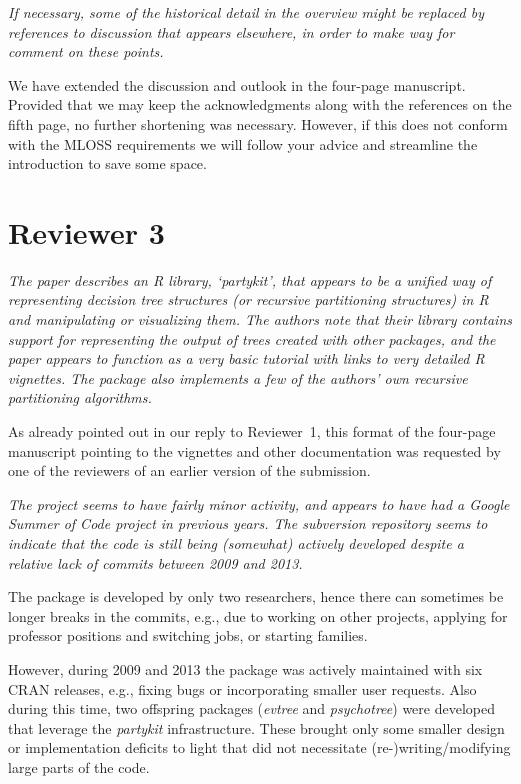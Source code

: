 \documentclass{article}
\begin{document}
\textit{If necessary, some of the historical detail in the overview might be replaced
by references to discussion that appears elsewhere, in order to make way for
comment on these points.}

\smallskip

We have extended the discussion and outlook in the four-page manuscript. Provided
that we may keep the acknowledgments along with the references on the fifth page,
no further shortening was necessary. However, if this does not conform with the
MLOSS requirements we will follow your advice and streamline the introduction to
save some space.

\section*{Reviewer 3}

\textit{%
The paper describes an R library, `partykit', that appears to be a unified
way of representing decision tree structures (or recursive partitioning
structures) in R and manipulating or visualizing them.  The authors note
that their library contains support for representing the output of trees
created with other packages, and the paper appears to function as a very
basic tutorial with links to very detailed R vignettes.  The package also
implements a few of the authors' own recursive partitioning algorithms.}

\smallskip

As already pointed out in our reply to Reviewer~1, this format of the
four-page manuscript pointing to the vignettes and other documentation was
requested by one of the reviewers of an earlier version of the submission.

\medskip

\textit{%
The project seems to have fairly minor activity, and appears to have had a
Google Summer of Code project in previous years.  The subversion repository
seems to indicate that the code is still being (somewhat) actively developed
despite a relative lack of commits between 2009 and 2013.
}

\smallskip

The package is developed by only two researchers, hence there can sometimes
be longer breaks in the commits, e.g., due to working on other projects,
applying for professor positions and switching jobs, or starting families.

However, during 2009 and 2013 the package was actively maintained with six
CRAN releases, e.g., fixing bugs or incorporating smaller user requests. Also
during this time, two offspring packages (\emph{evtree} and \emph{psychotree}) were
developed that leverage the \emph{partykit} infrastructure. These brought
only some smaller design or implementation deficits to light that did not
necessitate (re-)writing/modifying large parts of the code.
\end{document}
